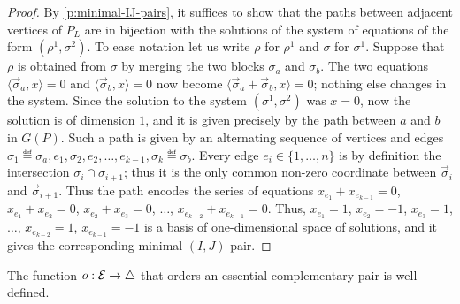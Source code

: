 \begin{proof}
    By \cref{p:minimal-IJ-pairs}, it suffices to show that the paths between adjacent vertices of $P_L$ are in bijection with the solutions of the system of equations of the form $(\rho^1,\sigma^2)$. 
    To ease notation let us write $\rho$ for $\rho^1$ and $\sigma$ for $\sigma^1$. 
    Suppose that $\rho$ is obtained from $\sigma$ by merging the two blocks $\sigma_a$ and $\sigma_b$. 
    The two equations $\langle \vec \sigma_a, x \rangle =0$ and $\langle \vec \sigma_b, x \rangle =0$ now become $\langle \vec \sigma_a + \vec \sigma_b, x \rangle =0$; nothing else changes in the system. 
    Since the solution to the system $(\sigma^1,\sigma^2)$ was $x=0$, now the solution is of dimension $1$, and it is given precisely by the path between $a$ and $b$ in $G(P)$.
    Such a path is given by an alternating sequence of vertices and edges $\sigma_1 \eqdef \sigma_a, e_1, \sigma_2, e_2, \ldots, e_{k-1}, \sigma_k \eqdef \sigma_b$. 
    Every edge $e_i \in \{1,\ldots, n\}$ is by definition the intersection $\sigma_{i} \cap \sigma_{i+1}$; thus it is the only common non-zero coordinate between $\vec \sigma_{i}$ and $\vec \sigma_{i+1}$.
    Thus the path encodes the series of equations $x_{e_1}+x_{e_{k-1}}=0$, $x_{e_1}+x_{e_2}=0$, $x_{e_2}+x_{e_3}=0$, $\ldots$, $x_{e_{k-2}}+x_{e_{k-1}}=0$. 
    Thus, $x_{e_1}=1$, $x_{e_2}=-1$, $x_{e_3}=1$, $\ldots$, $x_{e_{k-2}}=1$, $x_{e_{k-1}}=-1$ is a basis of one-dimensional space of solutions, and it gives the corresponding minimal $(I,J)$-pair. 
\end{proof}

\begin{lemma} 
\label{o well defined}
The function $o:\mathcal{E} \to \triangle$ that orders an essential complementary pair is well defined.
\end{lemma}

